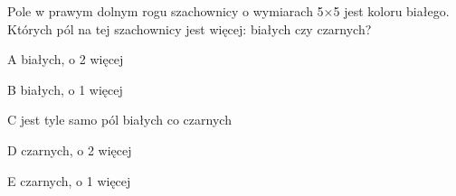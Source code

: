 \begin{tresc}
Pole w prawym dolnym rogu szachownicy o wymiarach 5×5 jest koloru białego. Których pól na tej szachownicy jest więcej: białych czy czarnych?
\end{tresc}
\begin{wariant}{A} białych, o 2 więcej \end{wariant}
\begin{wariant}{B} białych, o 1 więcej \end{wariant}
\begin{wariant}{C} jest tyle samo pól białych co czarnych \end{wariant}
\begin{wariant}{D} czarnych, o 2 więcej \end{wariant}
\begin{wariant}{E} czarnych, o 1 więcej \end{wariant}
